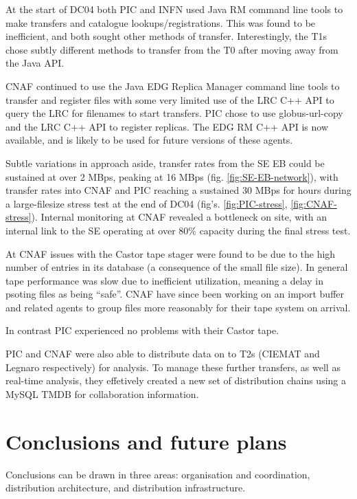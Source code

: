 \documentclass{cmspaper}
\begin{document}
At the start of DC04 both PIC and INFN used Java RM command line tools
to make transfers and catalogue lookups/registrations. This was found
to be inefficient, and both sought other methods of
transfer. Interestingly, the T1s chose subtly different methods to
transfer from the T0 after moving away from the Java API.

CNAF continued to use the Java EDG Replica Manager command line tools
to transfer and register files with some very limited use of the LRC
C++ API to query the LRC for filenames to start transfers. PIC chose
to use globus-url-copy and the LRC C++ API to register replicas. The
EDG RM C++ API is now available, and is likely to be used for future
versions of these agents.

Subtle variations in approach aside, transfer rates from the SE EB
could be sustained at over 2 MBps, peaking at 16 MBps
(fig. \ref{fig:SE-EB-network}), with transfer rates into CNAF and PIC
reaching a sustained 30 MBps for hours during a large-filesize stress
test at the end of DC04 (fig's. \ref{fig:PIC-stress},
\ref{fig:CNAF-stress}). Internal monitoring at CNAF revealed a
bottleneck on site, with an internal link to the SE operating at over
80\% capacity during the final stress test.

At CNAF issues with the Castor tape stager were found to be due to the
high number of entries in its database (a consequence of the small
file size). In general tape performance was slow due to inefficient
utilization, meaning a delay in psoting files as being ``safe''. CNAF
have since been working on an import buffer and related agents to
group files more reasonably for their tape system on arrival.

In contrast PIC experienced no problems with their Castor tape.

PIC and CNAF were also able to distribute data on to T2s (CIEMAT and
Legnaro respectively) for analysis. To manage these further transfers,
as well as real-time analysis, they effetively created a new set of
distribution chains using a MySQL TMDB for collaboration information.

\section{Conclusions and future plans}
Conclusions can be drawn in three areas: organisation and coordination, distribution 
architecture, and distribution infrastructure.
\end{document}
